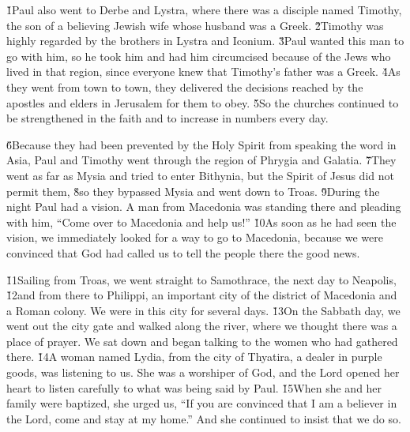 \v{1}Paul also went to Derbe and Lystra, where there was a disciple named Timothy, the son of a believing Jewish wife whose husband was a Greek. \v{2}Timothy was highly regarded by the brothers in Lystra and Iconium. \v{3}Paul wanted this man to go with him, so he took him and had him circumcised because of the Jews who lived in that region, since everyone knew that Timothy's father was a Greek. \v{4}As they went from town to town, they delivered the decisions reached by the apostles and elders in Jerusalem for them to obey. \v{5}So the churches continued to be strengthened in the faith and to increase in numbers every day.

\v{6}Because they had been prevented by the Holy Spirit from speaking the word in Asia, Paul and Timothy went through the region of Phrygia and Galatia. \v{7}They went as far as Mysia and tried to enter Bithynia, but the Spirit of Jesus did not permit them, \v{8}so they bypassed Mysia and went down to Troas. \v{9}During the night Paul had a vision. A man from Macedonia was standing there and pleading with him, ``Come over to Macedonia and help us!'' \v{10}As soon as he had seen the vision, we immediately looked for a way to go to Macedonia, because we were convinced that God had called us to tell the people there the good news.

\v{11}Sailing from Troas, we went straight to Samothrace, the next day to Neapolis, \v{12}and from there to Philippi, an important city of the district of Macedonia and a Roman colony. We were in this city for several days. \v{13}On the Sabbath day, we went out the city gate and walked along the river, where we thought there was a place of prayer. We sat down and began talking to the women who had gathered there. \v{14}A woman named Lydia, from the city of Thyatira, a dealer in purple goods, was listening to us. She was a worshiper of God, and the Lord opened her heart to listen carefully to what was being said by Paul. \v{15}When she and her family were baptized, she urged us, ``If you are convinced that I am a believer in the Lord, come and stay at my home.'' And she continued to insist that we do so.

